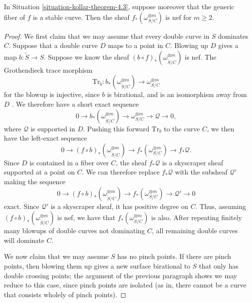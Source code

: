\begin{theorem}
\label{theorem-rel-dualizing-nef}
In Situation \ref{situation-kollar-theorem-4.3}, suppose moreover that the
generic fiber of $f$ is a stable curve.
Then the sheaf $f_*(\omega_{S/C}^{\otimes m})$ is nef for $m \geq 2$.
\end{theorem}
\begin{proof}
We first claim that we may assume that every double curve in $S$ dominates $C$.
Suppose that a double curve $D$ maps to a point in $C$.
Blowing up $D$ gives a map $b :
\widetilde{S} \to S$.
Suppose we know the sheaf $(b \circ f)_*(\omega_{\widetilde{S}/C}^{\otimes m})$
is nef.
The Grothendieck trace morphism
$$
\mathrm{Tr}_b : b_*(\omega_{\widetilde{S}/C}^{\otimes m})
\longrightarrow \omega_{S/C}^{\otimes m}
$$
for the blowup is injective, since $b$ is birational, and is an isomorphism away
from $D$ \cite[Prop.\ 5.77]{km}.
We therefore have a short exact sequence
$$
0 \longrightarrow b_*(\omega_{\widetilde{S}/C}^{\otimes m})
\longrightarrow \omega_{S/C}^{\otimes m} \longrightarrow \mathcal{Q}
\longrightarrow 0,
$$
where $\mathcal{Q}$ is supported in $D$.
Pushing this forward $\mathrm{Tr}_b$ to the curve $C$, we then have the
left-exact sequence
$$
0 \longrightarrow (f \circ b)_*(\omega_{\widetilde{S}/C}^{\otimes m})
\longrightarrow f_*(\omega_{S/C}^{\otimes m}) \longrightarrow f_*\mathcal{Q}.
$$
Since $D$ is contained in a fiber over $C$, the sheaf $f_*\mathcal{Q}$ is a
skyscraper sheaf supported at a point on $C$.
We can therefore replace $f_*\mathcal{Q}$ with the subsheaf $\mathcal{Q}'$
making the sequence
$$
0 \longrightarrow (f \circ b)_*(\omega_{\widetilde{S}/C}^{\otimes m})
\longrightarrow f_*(\omega_{S/C}^{\otimes m}) \longrightarrow \mathcal{Q}'
\longrightarrow 0
$$
exact.
Since $\mathcal{Q}'$ is a skyscraper sheaf, it has positive degree on $C$.
Thus, assuming $(f \circ b)_*(\omega_{\widetilde{S}/C}^{\otimes m})$ is
nef, we have that $f_*(\omega_{S/C}^{\otimes m})$ is also.
After repeating finitely many blowups of double curves not dominating $C$,
all remaining double curves will dominate $C$.

We now claim that we may assume $S$ has no pinch points. If there are pinch
points, then blowing them up gives a new surface birational to $S$ that only has
double crossing points; the argument of the previous paragraph shows we may
reduce to this case, since pinch points are isolated (as in, there cannot be a
curve that consists wholely of pinch points).


\end{proof}
